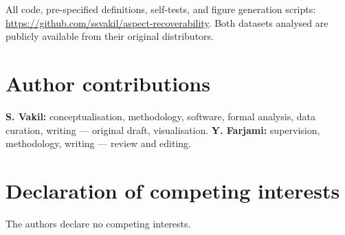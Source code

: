 \documentclass[11pt,a4paper]{article}
\makeatletter
\let\original@section\section
\renewcommand{\section}{\FloatBarrier\original@section}%
\makeatother
\begin{document}
All code, pre-specified definitions, self-tests, and figure generation
scripts: \url{https://github.com/ssvakil/aspect-recoverability}. Both datasets
analysed are publicly available from their original distributors.

\section*{Author contributions}

\textbf{S. Vakil:} conceptualisation, methodology, software, formal analysis,
data curation, writing --- original draft, visualisation.
\textbf{Y. Farjami:} supervision, methodology, writing --- review and editing.

\section*{Declaration of competing interests}

The authors declare no competing interests.

\FloatBarrier
\end{document}
